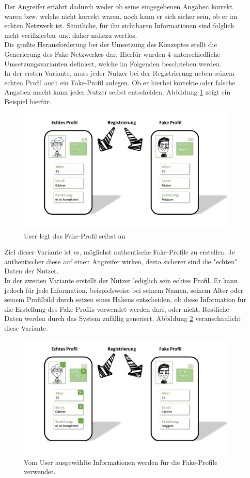 \documentclass{sigchi}
\begin{document}
Der Angreifer erfährt dadurch weder ob seine eingegebenen Angaben korrekt waren bzw. welche nicht korrekt waren, noch kann er sich sicher sein, ob er im echten Netzwerk ist. Sämtliche, für ihn sichtbaren Informationen sind folglich nicht verifizierbar und daher nahezu wertlos. \\
Die größte Herausforderung bei der Umsetzung des Konzeptes stellt die Generierung des Fake-Netzwerkes dar. Hierfür wurden 4 unterschiedliche Umsetzungsvarianten definiert, welche im Folgenden beschrieben werden. \\
In der ersten Variante, muss jeder Nutzer bei der Registrierung neben seinem echten Profil auch ein Fake-Profil anlegen. Ob er hierbei korrekte oder falsche Angaben macht kann jeder Nutzer selbst entscheiden. Abbildung \ref{fig:Umsetzung1} zeigt ein Beispiel hierfür. 
\begin{figure}[htbp]
\includegraphics[width=0.8\columnwidth]{figures/Umsetzung1.PNG}
\caption{User legt das Fake-Profil selbst an}
\label{fig:Umsetzung1}
\end{figure}
Ziel dieser Variante ist es, möglichst authentische Fake-Profile zu erstellen. Je authentischer diese auf einen Angreifer wirken, desto sicherer sind die "echten" Daten der Nutzer. \\
In der zweiten Variante erstellt der Nutzer lediglich sein echtes Profil. Er kann jedoch für jede Information, beispielsweise bei seinem Namen, seinem Alter oder seinem Profilbild durch setzen eines Hakens entscheiden, ob diese Information für die Erstellung des Fake-Profils verwendet werden darf, oder nicht. Restliche Daten werden durch das System zufällig generiert. Abbildung \ref{fig:Umsetzung2} veranschaulicht diese Variante. 
\begin{figure}[htbp]
	\includegraphics[width=0.8\columnwidth]{figures/Umsetzung2.PNG}
	\caption{Vom User ausgewählte Informationen werden für die Fake-Profile verwendet.}
	\label{fig:Umsetzung2}
\end{figure}
\end{document}
